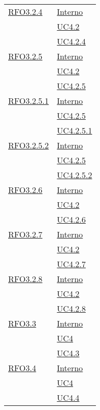 \begin{longtable}{|>{\centering}m{5cm}|m{5cm}<{\centering}|}
\hyperlink{RFO3.2.4}{RFO3.2.4} &  \hyperlink{Interno}{Interno}\\ &\hyperref[UC4.2]{UC4.2}\\ &\hyperref[UC4.2.4]{UC4.2.4}\\ \hline

\hyperlink{RFO3.2.5}{RFO3.2.5} &  \hyperlink{Interno}{Interno}\\ &\hyperref[UC4.2]{UC4.2}\\ &\hyperref[UC4.2.5]{UC4.2.5}\\ \hline

\hyperlink{RFO3.2.5.1}{RFO3.2.5.1} &  \hyperlink{Interno}{Interno}\\ &\hyperref[UC4.2.5]{UC4.2.5}\\ &\hyperref[UC4.2.5.1]{UC4.2.5.1}\\ \hline

\hyperlink{RFO3.2.5.2}{RFO3.2.5.2} &  \hyperlink{Interno}{Interno}\\ &\hyperref[UC4.2.5]{UC4.2.5}\\ &\hyperref[UC4.2.5.2]{UC4.2.5.2}\\ \hline

\hyperlink{RFO3.2.6}{RFO3.2.6} &  \hyperlink{Interno}{Interno}\\ &\hyperref[UC4.2]{UC4.2}\\ &\hyperref[UC4.2.6]{UC4.2.6}\\ \hline

\hyperlink{RFO3.2.7}{RFO3.2.7} &  \hyperlink{Interno}{Interno}\\ &\hyperref[UC4.2]{UC4.2}\\ &\hyperref[UC4.2.7]{UC4.2.7}\\ \hline

\hyperlink{RFO3.2.8}{RFO3.2.8} &  \hyperlink{Interno}{Interno}\\ &\hyperref[UC4.2]{UC4.2}\\ &\hyperref[UC4.2.8]{UC4.2.8}\\ \hline

\hyperlink{RFO3.3}{RFO3.3} &  \hyperlink{Interno}{Interno}\\ &\hyperref[UC4]{UC4}\\ &\hyperref[UC4.3]{UC4.3}\\ \hline

\hyperlink{RFO3.4}{RFO3.4} &  \hyperlink{Interno}{Interno}\\ &\hyperref[UC4]{UC4}\\ &\hyperref[UC4.4]{UC4.4}\\ \hline


\end{longtable}
